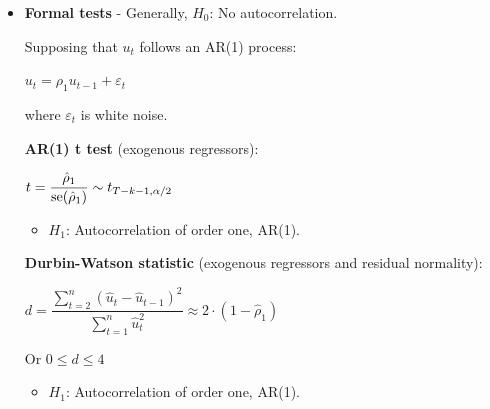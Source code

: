 \begin{f}[Detection]
\begin{itemize}[leftmargin=*]
	
	\textbf{MA(\(q\)) process}. \underline{ACF}: \underline{ACF}: only the first \(q\) coefficients are significant, the remaining are abruptly cancelled. \underline{PACF}: attenuated exponential fast decay or sine waves.
	
	\textbf{AR(\(p\)) process}. \underline{ACF}: attenuated exponential fast decay or sine waves. \underline{PACF}: only the first \(p\) coefficients are significant, the remaining are abruptly cancelled.

	
	\textbf{ARMA(\(p, q\)) process}. \underline{ACF} and \underline{PACF}: the coefficients are not abruptly cancelled and present a fast decay.
	
	If the ACF coefficients do not decay rapidly, there is a clear indicator of a lack of stationarity in mean.
	
	\item \textbf{Formal tests} - Generally, \(H_{0}\): No autocorrelation.
	
	Supposing that \(u_{t}\) follows an AR(1) process:
	
	\begin{center}
		\(u_{t} = \rho_{1} u_{t - 1} + \varepsilon_{t}\)
	\end{center}
	
	where \(\varepsilon_{t}\) is white noise.
	
	\textbf{AR(1) t test} (exogenous regressors):
	
	\begin{center}
		\(t = \dfrac{\hat{\rho}_{1}}{\mathrm{se}(\hat{\rho}_{1})} \sim t_{T - k - 1, \alpha/2}\)
	\end{center}
	
	\begin{itemize}[leftmargin=*]
		\item \(H_{1}\): Autocorrelation of order one, AR(1).
	\end{itemize}
	
	\textbf{Durbin-Watson statistic} (exogenous regressors and residual normality):
	
	\begin{center}
		\(d = \dfrac{\sum_{t=2}^{n} (\hat{u}_{t} - \hat{u}_{t - 1})^{2}}{\sum_{t=1}^{n} \hat{u}_{t}^{2}} \approx 2 \cdot (1 - \hat{\rho}_{1})\)
	\end{center}
	
	Or \(0 \leq d \leq 4\)
	
	\begin{itemize}[leftmargin=*]
		\item \(H_{1}\): Autocorrelation of order one, AR(1).
	\end{itemize}
	

\end{itemize}
\end{f}
